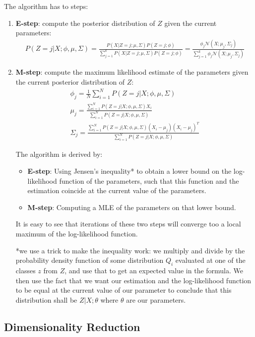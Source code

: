 \documentclass{article}
\begin{document}
The algorithm has to steps:
\begin{enumerate}
\item \textbf{E-step}: compute the posterior distribution of $Z$ given the current parameters:
\begin{gather*}
P(Z = j | X ; \phi, \mu, \Sigma) =
\frac{P(X | Z = j ; \mu, \Sigma) P(Z = j ; \phi)}{\sum_{j=1}^k P(X | Z = j ; \mu, \Sigma) P(Z = j ; \phi)} = 
\frac{\phi_j \mathcal{N}(X ; \mu_j, \Sigma_j)}{\sum_{j=1}^k \phi_j \mathcal{N}(X ; \mu_j, \Sigma_j)}
\end{gather*}
\item \textbf{M-step}: compute the maximum likelihood estimate of the parameters given the current posterior distribution of $Z$:
\begin{gather*}
\phi_j = \frac{1}{N} \sum_{i=1}^N P(Z = j | X ; \phi, \mu, \Sigma) \\
\mu_j = \frac{\sum_{i=1}^N P(Z = j | X ; \phi, \mu, \Sigma) X_i}{\sum_{i=1}^N P(Z = j | X ; \phi, \mu, \Sigma)} \\
\Sigma_j = \frac{\sum_{i=1}^N P(Z = j | X ; \phi, \mu, \Sigma) (X_i - \mu_j)(X_i - \mu_j)^T}{\sum_{i=1}^N P(Z = j | X ; \phi, \mu, \Sigma)}
\end{gather*}

The algorithm is derived by:
\begin{itemize}
\item \textbf{E-step}: Using Jensen's inequality* to obtain a lower bound on the log-likelihood function of the parameters, such that this function and the estimation coincide at the current value of the parameters.
\item \textbf{M-step}: Computing a MLE of the parameters on that lower bound.
\end{itemize}

It is easy to see that iterations of these two steps will converge too a local maximum of the log-likelihood function.

*we use a trick to make the inequality work: we multiply and divide by the probability density function of some distribution $Q_i$ evaluated at one of the classes $z$ from $Z$, and use that to get an expected value in the formula.
We then use the fact that we want our estimation and the log-likelihood function to be equal at the current value of our parameter to conclude that this distribution shall be $Z | X ; \theta$ where $\theta$ are our parameters.

\end{enumerate}

\subsection{Dimensionality Reduction}
\end{document}
